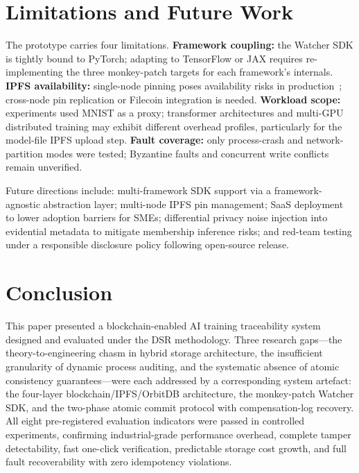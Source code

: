 \documentclass[10pt,twocolumn]{article}
\begin{document}
\section{Limitations and Future Work}

The prototype carries four limitations. \textbf{Framework coupling:} the Watcher SDK is
tightly bound to PyTorch; adapting to TensorFlow or JAX requires re-implementing the
three monkey-patch targets for each framework's internals. \textbf{IPFS availability:}
single-node pinning poses availability risks in production~\cite{trautwein2022,shi2024};
cross-node pin replication or Filecoin integration is needed. \textbf{Workload scope:}
experiments used MNIST as a proxy; transformer architectures and multi-GPU distributed
training may exhibit different overhead profiles, particularly for the model-file IPFS
upload step. \textbf{Fault coverage:} only process-crash and network-partition modes were
tested; Byzantine faults and concurrent write conflicts remain unverified.

Future directions include: multi-framework SDK support via a framework-agnostic
abstraction layer; multi-node IPFS pin management; SaaS deployment to lower adoption
barriers for SMEs; differential privacy noise injection into evidential metadata to
mitigate membership inference risks; and red-team testing under a responsible disclosure
policy following open-source release.

\section{Conclusion}

This paper presented a blockchain-enabled AI training traceability system designed and
evaluated under the DSR methodology. Three research gaps---the theory-to-engineering
chasm in hybrid storage architecture, the insufficient granularity of dynamic process
auditing, and the systematic absence of atomic consistency guarantees---were each
addressed by a corresponding system artefact: the four-layer blockchain/IPFS/OrbitDB
architecture, the monkey-patch Watcher SDK, and the two-phase atomic commit protocol
with compensation-log recovery. All eight pre-registered evaluation indicators were
passed in controlled experiments, confirming industrial-grade performance overhead,
complete tamper detectability, fast one-click verification, predictable storage cost
growth, and full fault recoverability with zero idempotency violations.
\end{document}

